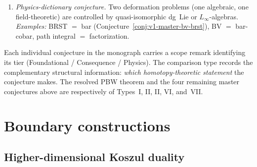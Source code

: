 \begin{convention}
\begin{enumerate}[label=\textbf{Type \Roman*.}, leftmargin=3em]
\item \emph{Physics-dictionary conjecture.}
 Two deformation problems (one algebraic, one
 field-theoretic) are controlled by quasi-isomorphic dg~Lie or
 $L_\infty$-algebras.
 \emph{Examples:} BRST $=$ bar
 (Conjecture~\ref{conj:v1-master-bv-brst}),
 BV $=$ bar-cobar, path integral $=$ factorization.
\end{enumerate}
\end{convention}

\begin{remark}\label{rem:template-usage}
Each individual conjecture in the monograph carries a scope remark
identifying its tier (Foundational / Consequence / Physics).
The comparison type records the complementary structural information:
\emph{which homotopy-theoretic statement} the conjecture makes. The
resolved PBW theorem and the four remaining master conjectures above
are respectively of Types~I, II, II, VI, and~VII.
\end{remark}


\section{Boundary constructions}
\label{sec:research-programmes}

\subsection{Higher-dimensional Koszul duality}
\label{subsec:higher-dim-kd}

